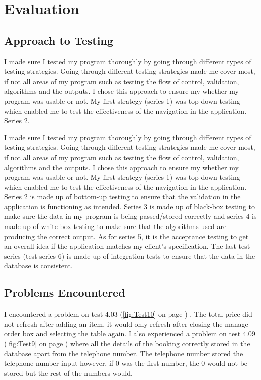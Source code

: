 \section{Evaluation}

\subsection{Approach to Testing}


I made sure I tested my program thoroughly by going through different types of testing strategies. Going through different testing strategies made me cover most, if not all areas of my program such as testing the flow of control, validation, algorithms and the outputs.  I chose this approach to ensure my whether my program was usable or not. My first strategy (series 1) was top-down testing which enabled me to test the effectiveness of the navigation in the application. Series 2.

I made sure I tested my program thoroughly by going through different types of testing strategies. Going through different testing strategies made me cover most, if not all areas of my program such as testing the flow of control, validation, algorithms and the outputs.  I chose this approach to ensure my whether my program was usable or not. My first strategy (series 1) was top-down testing which enabled me to test the effectiveness of the navigation in the application. Series 2 is made up of bottom-up testing to ensure that the validation in the application is functioning as intended. Series 3 is made up of black-box testing to make sure the data in my program is being passed/stored correctly and series 4 is made up of white-box testing to make sure that the algorithms used are producing the correct output. As for series 5, it is the acceptance testing to get an overall idea if the application matches my client's specification. The last test series (test series 6) is made up of integration tests to ensure that the data in the database is consistent.


\subsection{Problems Encountered}

I encountered a problem on test 4.03 (\ref{fig:Test10} on page \pageref{fig:Test10}) . The total price did not refresh after adding an item, it would only refresh after closing the manage order box and selecting the table again. I also experienced a problem on test 4.09 (\ref{fig:Test9} on page \pageref{fig:Test9}) where all the details of the booking correctly stored in the database apart from the telephone number. The telephone number stored the telephone number input however, if 0 was the first number, the 0 would not be stored but the rest of the numbers would.

